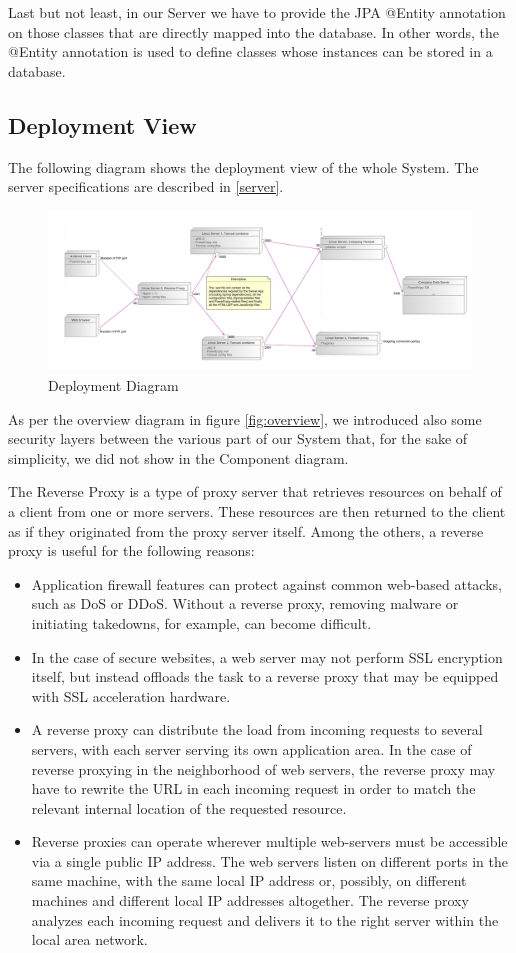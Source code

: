 \documentclass[12pt]{article}
\begin{document}
\bigskip
Last but not least, in our Server we have to provide the JPA @Entity annotation on those classes that are directly mapped into the database. In other words, the @Entity annotation is used to define classes whose instances can be stored in a database.


\subsection{Deployment View}
The following diagram shows the deployment view of the whole System. The server specifications are described in \ref{server}.
\begin{figure}[h]
	\centering
	\includegraphics[width=\textwidth]{../Images/Deployment}
	\caption{Deployment Diagram}
\end{figure}

As per the overview diagram in figure \ref{fig:overview}, we introduced also some security layers between the various part of our System that, for the sake of simplicity, we did not show in the Component diagram.

The Reverse Proxy is a type of proxy server that retrieves resources on behalf of a client from one or more servers. These resources are then returned to the client as if they originated from the proxy server itself. Among the others, a reverse proxy is useful for the following reasons:
\begin{itemize}
\item Application firewall features can protect against common web-based attacks, such as DoS or DDoS. Without a reverse proxy, removing malware or initiating takedowns, for example, can become difficult.
\item In the case of secure websites, a web server may not perform SSL encryption itself, but instead offloads the task to a reverse proxy that may be equipped with SSL acceleration hardware.
\item A reverse proxy can distribute the load from incoming requests to several servers, with each server serving its own application area. In the case of reverse proxying in the neighborhood of web servers, the reverse proxy may have to rewrite the URL in each incoming request in order to match the relevant internal location of the requested resource.
\item Reverse proxies can operate wherever multiple web-servers must be accessible via a single public IP address. The web servers listen on different ports in the same machine, with the same local IP address or, possibly, on different machines and different local IP addresses altogether. The reverse proxy analyzes each incoming request and delivers it to the right server within the local area network.
\end{itemize}
\end{document}
